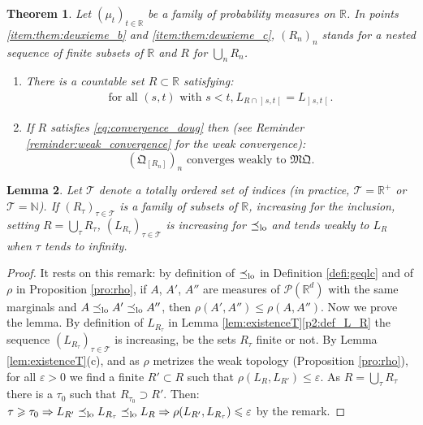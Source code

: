 \documentclass[10pt,a4paper]{article}
\theoremstyle{plain}
\newtheorem{them}{Theorem}[section]
\newtheorem{lem}[them]{Lemma}
\theoremstyle{definition}
\newcommand{\como}{\mathfrak{Q}}
\newcommand{\mq}{\mathfrak{MQ}}
\newcommand{\Tt}{{\mathcal T}}
\let\eps\varepsilon
\newcommand{\p}{\mathcal{P}}
\newcommand{\R}{\mathbb{R}}
\newcommand{\N}{\mathbb{N}}
\newcommand{\op}{\mathopen}
\newcommand{\clo}{\mathclose}
\newcommand{\leqlc}{\preceq_{\rm lo}}
\begin{document}
\begin{them}\label{them:deuxieme_sec} Let $(\mu_t)_{t\in \R}$ be a family of probability measures on $\R$. In points \eqref{item:them:deuxieme_b} and \eqref{item:them:deuxieme_c}, $(R_n)_n$ stands for a nested sequence of finite subsets of\/ $\R$ and $R$ for $\bigcup_nR_n$.

\begin{enumerate}
\item
\label{item:them:deuxieme_a} There is a countable set $R\subset\R$ satisfying:
\begin{gather}\label{eq:convergence_doug}
\text{for all $(s,t)$ with $s<t$,}\ L_{R\cap\op]s,t\clo[}=L_{\op]s,t\clo[}.
\end{gather}

\item
\label{item:them:deuxieme_b} If $R$ satisfies \eqref{eq:convergence_doug} then (see Reminder \ref{reminder:weak_convergence} for the weak convergence):
\begin{equation}\label{eq:cv}
\text{$(\como_{[R_n]})_n$ converges weakly to $\mq$.}
\end{equation}

\end{enumerate}
\end{them}

\begin{lem}\label{lem:croissance_lc} Let $\Tt$ denote a totally ordered set of indices (in practice, $\Tt=\R^+$ or $\Tt=\N$). If $(R_\tau)_{\tau\in \Tt}$ is a family of subsets of\/ $\R$, increasing for the inclusion, setting $R=\bigcup_\tau R_\tau$, $(L_{R_\tau})_{\tau\in\Tt}$ is increasing for $\leqlc$ and tends weakly to $L_{R}$ when $\tau$ tends to infinity.
\end{lem}

\begin{proof} It rests on this remark: by definition of $\leqlc$ in Definition \ref{defi:geqlc} and of $\rho$ in Proposition \ref{pro:rho}, if $A$, $A'$, $A''$ are measures of $\p(\R^d)$ with the same marginals and $A\leqlc A'\leqlc A''$, then $\rho(A',A'')\leqslant\rho(A,A'')$. Now we prove the lemma. By definition of $L_{R_\tau}$ in Lemma \ref{lem:existenceT}\eqref{p2:def_L_R} the sequence $(L_{R_\tau})_{\tau\in\Tt}$ is increasing, be the sets $R_\tau$ finite or not. By Lemma \ref{lem:existenceT}(c), and as $\rho$ metrizes the weak topology (Proposition \ref{pro:rho}), for all $\eps>0$ we find a finite $R'\subset R$ such that $\rho(L_R,L_{R'})\leqslant\eps$. As $R=\bigcup_\tau R_\tau$ there is a $\tau_0$ such that $R_{\tau_0}\supset R'$. Then: $\tau\geqslant \tau_0\Rightarrow L_{R'}\leqlc L_{R_\tau}\leqlc L_{R}\Rightarrow \rho(L_{R'},L_{R_\tau})\leqslant\eps$ by the remark.
\end{proof}
\end{document}
